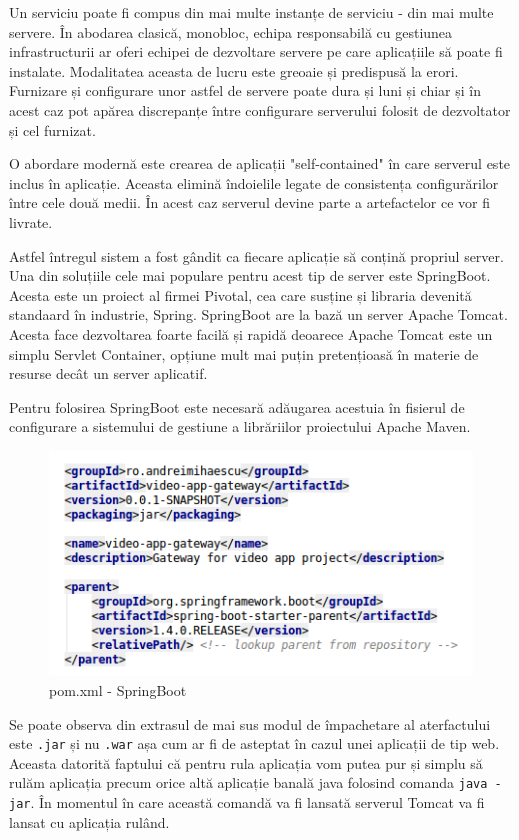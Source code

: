 \documentclass[12pt, a4paper, oneside, romanian]{teza-upb}
\begin{document}
Un serviciu poate fi compus din mai multe instanțe de serviciu - din mai multe servere. În abodarea clasică, monobloc, echipa responsabilă cu gestiunea infrastructurii ar oferi echipei de dezvoltare servere pe care aplicațiile să poate fi instalate. Modalitatea aceasta de lucru este greoaie și predispusă la erori. Furnizare și configurare unor astfel de servere poate dura și luni și chiar și în acest caz pot apărea discrepanțe între configurare serverului folosit de dezvoltator și cel furnizat. 

O abordare modernă este crearea de aplicații "self-contained" în care serverul este inclus în aplicație. Aceasta elimină îndoielile legate de consistența configurărilor între cele două medii. În acest caz serverul devine parte a artefactelor ce vor fi livrate. 

Astfel întregul sistem a fost gândit ca fiecare aplicație să conțină propriul server. Una din soluțiile cele mai populare pentru acest tip de server este SpringBoot. Acesta este un proiect al firmei Pivotal, cea care susține și libraria devenită standaard în industrie, Spring. SpringBoot are la bază un server Apache Tomcat. Acesta face dezvoltarea foarte facilă și rapidă deoarece Apache Tomcat este un simplu Servlet Container, opțiune mult mai puțin pretențioasă în materie de resurse decât un server aplicatif. 

Pentru folosirea SpringBoot este necesară adăugarea acestuia în fisierul de configurare a sistemului de gestiune a librăriilor proiectului Apache Maven.

\begin{figure}[ht]
\centering
\includegraphics[scale=0.7]{img/spring-boot-starter.png}
\caption{pom.xml - SpringBoot }
\label{fig:arhi_componente}
\end{figure}

Se poate observa din extrasul de mai sus modul de împachetare al aterfactului este \texttt{.jar} și nu \texttt{.war} așa cum ar fi de asteptat în cazul unei aplicații de tip web. Aceasta datorită faptului că pentru rula aplicația vom putea pur și simplu să rulăm aplicația precum orice altă aplicație banală java folosind comanda \texttt{java -jar}. În momentul în care această comandă va fi lansată serverul Tomcat va fi lansat cu aplicația rulând. 
\end{document}
